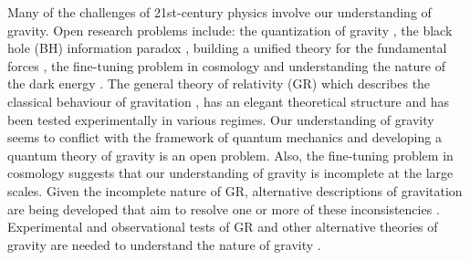 
Many of the challenges of 21st-century physics involve our understanding of gravity. Open research problems include: the quantization of gravity \cite{QG1,QG2,QG3,QG4}, the black hole (BH) information paradox \cite{BHIP1,BHIP2,BHIP3,BHIP0,BHIP4}, building a unified theory for the fundamental forces \cite{GUT}, the fine-tuning problem in cosmology \cite{CosmoConstant1,CosmoConstant2} and understanding the nature of the dark energy \cite{DarkEnergy}. The general theory of relativity (GR) which describes the classical behaviour of gravitation \cite{OnGR}, has an elegant theoretical structure and has been tested experimentally in various regimes\cite{ReviewAlternativeTheories1}. Our understanding of gravity seems to conflict with the framework of quantum mechanics \cite{GRvsQM3,GRvsQM1,GRvsQM2} and developing a quantum theory of gravity is an open problem.  Also, the fine-tuning problem in cosmology suggests that our understanding of gravity is incomplete at the large scales. Given the incomplete nature of GR, alternative descriptions of gravitation are being developed that aim to resolve one or more of these inconsistencies \cite{ReviewAlternativeTheories1,ReviewAlternativeTheories2,ModifiedGravity1,ModifiedGravity2}. Experimental and observational tests of GR and other alternative theories of gravity are needed to understand the nature of gravity \cite{kipTGR1,kipTGR2,kipTGR3,TGRwithLISA}.


